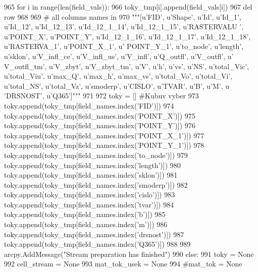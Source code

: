 \begin{DoxyCode}
{}
965       \textcolor{keywordflow}{for} i \textcolor{keywordflow}{in} range(len(field\_vals)):
966         toky\_tmp[i].append(field\_vals[i])
967       del row
968 
969     \textcolor{comment}{# all columns names in
}
970     \textcolor{stringliteral}{"""[u'FID', u'Shape', u'Id', u'Id\_1', u'Id\_12', u'Id\_12\_13', u'Id\_12\_1\_14', u'Id\_12\_1\_15', u'RASTERVALU
      ', u'POINT\_X', u'POINT\_Y', u'Id\_12\_1\_16', u'Id\_12\_1\_17', u'Id\_12\_1\_18', u'RASTERVA\_1', u'POINT\_X\_1', u'
      POINT\_Y\_1', u'to\_node', u'length', u'sklon', u'V\_infl\_ce', u'V\_infl\_us', u'V\_infl', u'Q\_outfl', u'V\_outfl', u'
      V\_outfl\_tm', u'V\_zbyt', u'V\_zbyt\_tm', u'V', u'h', u'vs', u'NS', u'total\_Vic', u'total\_Viu', u'max\_Q', u'max\_h',
       u'max\_vs', u'total\_Vo', u'total\_Vi', u'total\_NS', u'total\_Vz', u'smoderp', u'CISLO', u'TVAR', u'B', u'M', u
      'DRSNOST', u'Q365']"""}
971 
972     toky = [] \textcolor{comment}{#Kubuv vyber
}
973     toky.append(toky\_tmp[field\_names.index(\textcolor{stringliteral}{'FID'})])
974     toky.append(toky\_tmp[field\_names.index(\textcolor{stringliteral}{'POINT\_X'})])
975     toky.append(toky\_tmp[field\_names.index(\textcolor{stringliteral}{'POINT\_Y'})])
976     toky.append(toky\_tmp[field\_names.index(\textcolor{stringliteral}{'POINT\_X\_1'})])
977     toky.append(toky\_tmp[field\_names.index(\textcolor{stringliteral}{'POINT\_Y\_1'})])
978     toky.append(toky\_tmp[field\_names.index(\textcolor{stringliteral}{'to\_node'})])
979     toky.append(toky\_tmp[field\_names.index(\textcolor{stringliteral}{'length'})])
980     toky.append(toky\_tmp[field\_names.index(\textcolor{stringliteral}{'sklon'})])
981     toky.append(toky\_tmp[field\_names.index(\textcolor{stringliteral}{'smoderp'})])
982     toky.append(toky\_tmp[field\_names.index(\textcolor{stringliteral}{'cislo'})])
983     toky.append(toky\_tmp[field\_names.index(\textcolor{stringliteral}{'tvar'})])
984     toky.append(toky\_tmp[field\_names.index(\textcolor{stringliteral}{'b'})])
985     toky.append(toky\_tmp[field\_names.index(\textcolor{stringliteral}{'m'})])
986     toky.append(toky\_tmp[field\_names.index(\textcolor{stringliteral}{'drsnost'})])
987     toky.append(toky\_tmp[field\_names.index(\textcolor{stringliteral}{'Q365'})])
988 
989     arcpy.AddMessage(\textcolor{stringliteral}{"Stream preparation has finished"})
990   \textcolor{keywordflow}{else}:
991     toky = \textcolor{keywordtype}{None}
992     cell\_stream = \textcolor{keywordtype}{None}
993     mat\_tok\_usek = \textcolor{keywordtype}{None}
994     \textcolor{comment}{#mat\_tok = None
}
\end{DoxyCode}
